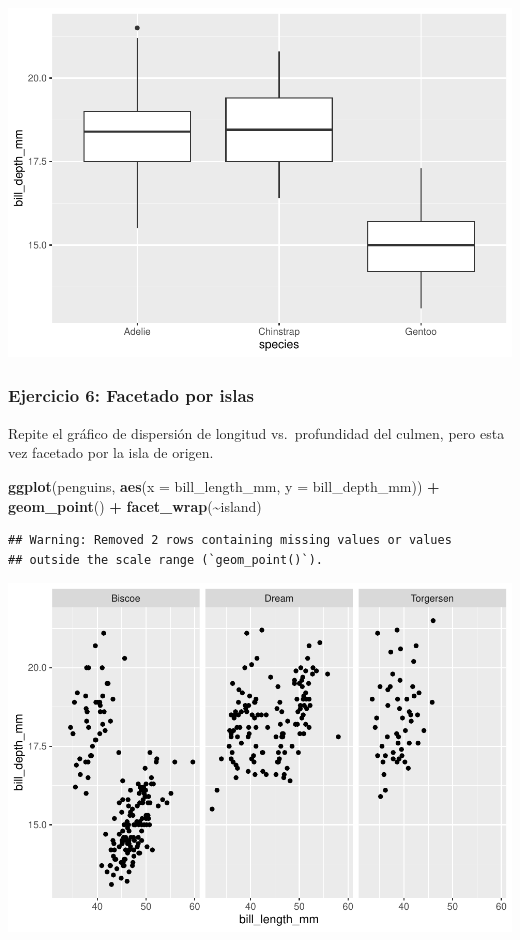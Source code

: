 \documentclass[
]{book}
\newenvironment{Shaded}{\begin{snugshade}}{\end{snugshade}}
\newcommand{\AttributeTok}[1]{\textcolor[rgb]{0.13,0.29,0.53}{#1}}
\newcommand{\FunctionTok}[1]{\textcolor[rgb]{0.13,0.29,0.53}{\textbf{#1}}}
\newcommand{\NormalTok}[1]{#1}
\newcommand{\SpecialCharTok}[1]{\textcolor[rgb]{0.81,0.36,0.00}{\textbf{#1}}}
\begin{document}
\includegraphics{bookdown-demo_files/figure-latex/unnamed-chunk-187-1.pdf}

\subsubsection{Ejercicio 6: Facetado por islas}\label{ejercicio-6-facetado-por-islas}

Repite el gráfico de dispersión de longitud vs.~profundidad del culmen, pero esta vez facetado por la isla de origen.

\begin{Shaded}
\begin{Highlighting}[]
\FunctionTok{ggplot}\NormalTok{(penguins, }\FunctionTok{aes}\NormalTok{(}\AttributeTok{x =}\NormalTok{ bill\_length\_mm, }\AttributeTok{y =}\NormalTok{ bill\_depth\_mm)) }\SpecialCharTok{+}
  \FunctionTok{geom\_point}\NormalTok{() }\SpecialCharTok{+}
  \FunctionTok{facet\_wrap}\NormalTok{(}\SpecialCharTok{\textasciitilde{}}\NormalTok{island)}
\end{Highlighting}
\end{Shaded}

\begin{verbatim}
## Warning: Removed 2 rows containing missing values or values
## outside the scale range (`geom_point()`).
\end{verbatim}

\includegraphics{bookdown-demo_files/figure-latex/unnamed-chunk-188-1.pdf}
\end{document}
